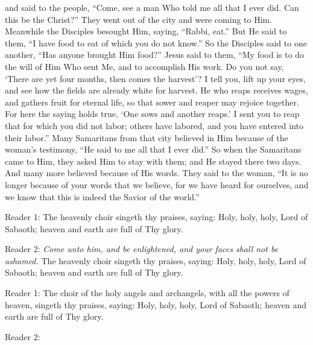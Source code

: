 \documentclass[twoside, letterpaper, 12pt]{report}
\begin{document}
\begin{maybetwocolumns}
  and said to the people, “Come, see a man Who told me all that I ever did. Can this be the Christ?”
  They went out of the city and were coming to Him. Meanwhile the Disciples besought Him,
  saying, “Rabbi, eat.” But He said to them, “I have food to eat of which you do not know.” So the
  Disciples said to one another, “Has anyone brought Him food?” Jesus said to them, “My food is
  to do the will of Him Who sent Me, and to accomplish His work. Do you not say, ‘There are yet
  four months, then comes the harvest’? I tell you, lift up your eyes, and see how the fields are
  already white for harvest. He who reaps receives wages, and gathers fruit for eternal life, so that
  sower and reaper may rejoice together. For here the saying holds true, ‘One sows and another
  reaps.’ I sent you to reap that for which you did not labor; others have labored, and you have
  entered into their labor.” Many Samaritans from that city believed in Him because of the woman’s
  testimony, “He said to me all that I ever did.” So when the Samaritans came to Him, they asked
  Him to stay with them; and He stayed there two days. And many more believed because of His
  words. They said to the woman, “It is no longer because of your words that we believe, for we
  have heard for ourselves, and we know that this is indeed the Savior of the world.”
\end{maybetwocolumns}

\begin{reader}
\item[Reader 1:] The heavenly choir singeth thy praises, saying:
  Holy, holy, holy, Lord of Sabaoth; heaven and earth are full of Thy glory.

\item[Reader 2:] \emph{Come unto him, and be enlightened,
               and your faces shall not be ashamed.}
  The heavenly choir singeth thy praises, saying:
  Holy, holy, holy, Lord of Sabaoth; heaven and earth are full of Thy glory.

\item[Reader 1:] \emph{\glory}
  The choir of the holy angels and archangels,
  with all the powers of heaven, singeth thy praises, saying:
  Holy, holy, holy, Lord of Sabaoth; heaven and earth are full of Thy glory.

\item[Reader 2:]\emph{\nowandever}
\end{reader}


\end{document}
